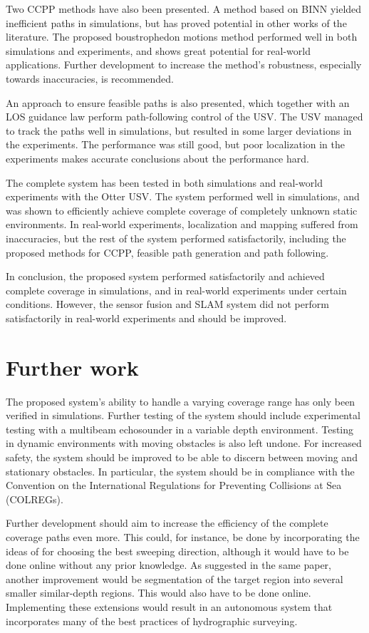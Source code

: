 Two CCPP methods have also been presented. A method based on BINN yielded inefficient paths in simulations, but has proved potential in other works of the literature. The proposed boustrophedon motions method performed well in both simulations and experiments, and shows great potential for real-world applications. Further development to increase the method's robustness, especially towards inaccuracies, is recommended.

An approach to ensure feasible paths is also presented, which together with an LOS guidance law perform path-following control of the USV. The USV managed to track the paths well in simulations, but resulted in some larger deviations in the experiments. The performance was still good, but poor localization in the experiments makes accurate conclusions about the performance hard. 

The complete system has been tested in both simulations and real-world experiments with the Otter USV. The system performed well in simulations, and was shown to efficiently achieve complete coverage of completely unknown static environments. In real-world experiments, localization and mapping suffered from inaccuracies, but the rest of the system performed satisfactorily, including the proposed methods for CCPP, feasible path generation and path following. 

In conclusion, the proposed system performed satisfactorily and achieved complete coverage in simulations, and in real-world experiments under certain conditions. However, the sensor fusion and SLAM system did not perform satisfactorily in real-world experiments and should be improved.

\section{Further work}

The proposed system's ability to handle a varying coverage range has only been verified in simulations. Further testing of the system should include experimental testing with a multibeam echosounder in a variable depth environment. Testing in dynamic environments with moving obstacles is also left undone. For increased safety, the system should be improved to be able to discern between moving and stationary obstacles. In particular, the system should be in compliance with the Convention on the International Regulations for Preventing Collisions at Sea (COLREGs).

Further development should aim to increase the efficiency of the complete coverage paths even more. This could, for instance, be done by incorporating the ideas of \citet{galceran2012efficient} for choosing the best sweeping direction, although it would have to be done online without any prior knowledge. As suggested in the same paper, another improvement would be segmentation of the target region into several smaller similar-depth regions. This would also have to be done online. Implementing these extensions would result in an autonomous system that incorporates many of the best practices of hydrographic surveying.

